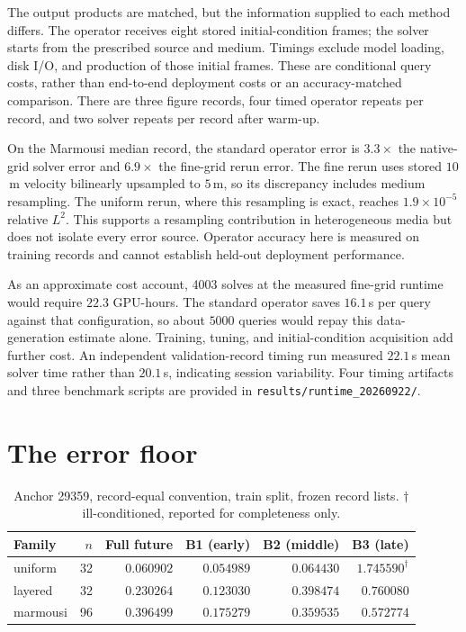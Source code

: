 \documentclass[11pt,a4paper]{article}
\begin{document}
The output products are matched, but the information supplied to each method differs. The
operator receives eight stored initial-condition frames; the solver starts from the prescribed
source and medium. Timings exclude model loading, disk I/O, and production of those initial
frames. These are conditional query costs, rather than end-to-end deployment costs or an
accuracy-matched comparison. There are three figure records, four timed operator repeats
per record, and two solver repeats per record after warm-up.

On the Marmousi median record, the standard operator error is $3.3\times$ the native-grid
solver error and $6.9\times$ the fine-grid rerun error. The fine rerun uses stored $10$\,m
velocity bilinearly upsampled to $5$\,m, so its discrepancy includes medium resampling.
The uniform rerun, where this resampling is exact, reaches $1.9\times10^{-5}$ relative $L^2$.
This supports a resampling contribution in heterogeneous media but does not isolate every
error source. Operator accuracy here is measured on training records and cannot establish
held-out deployment performance.

As an approximate cost account, 4003 solves at the measured fine-grid runtime would require
$22.3$ GPU-hours. The standard operator saves $16.1$\,s per query against that configuration,
so about $5000$ queries would repay this data-generation estimate alone. Training, tuning,
and initial-condition acquisition add further cost. An independent validation-record timing
run measured $22.1$\,s mean solver time rather than $20.1$\,s, indicating session variability.
Four timing artifacts and three benchmark scripts are provided in
\texttt{results/runtime\_20260922/}.

\section{The error floor}

\begin{table}[t]
\centering
\caption{Anchor 29359, record-equal convention, train split, frozen record lists.
$\dagger$ ill-conditioned, reported for completeness only.}
\label{tab:anchor}
\begin{tabular}{lrrrrr}
\toprule
Family & $n$ & Full future & B1 (early) & B2 (middle) & B3 (late) \\
\midrule
uniform  & 32 & $0.060902$ & $0.054989$ & $0.064430$ & $1.745590^\dagger$ \\
layered  & 32 & $0.230264$ & $0.123030$ & $0.398474$ & $0.760080$ \\
marmousi & 96 & $0.396499$ & $0.175279$ & $0.359535$ & $0.572774$ \\
\bottomrule
\end{tabular}
\end{table}
\end{document}
